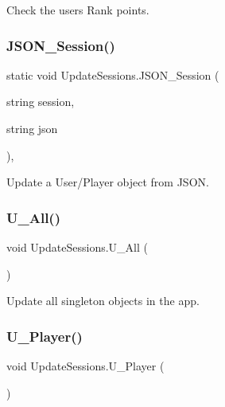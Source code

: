 Check the user\textquotesingle{}s Rank points. 

\mbox{\label{class_update_sessions_a841ee986ab762d64af283c9ba009c23d}} 
\subsubsection{\texorpdfstring{JSON\_Session()}{JSON\_Session()}}
{\footnotesize\ttfamily static void Update\+Sessions.\+J\+S\+O\+N\+\_\+\+Session (\begin{DoxyParamCaption}\item[{string}]{session,  }\item[{string}]{json }\end{DoxyParamCaption})\hspace{0.3cm}{\ttfamily [inline]}, {\ttfamily [static]}}



Update a User/\+Player object from J\+S\+ON. 

\mbox{\label{class_update_sessions_a0ea698e5b708671e7ba25a160b325833}} 
\subsubsection{\texorpdfstring{U\_All()}{U\_All()}}
{\footnotesize\ttfamily void Update\+Sessions.\+U\+\_\+\+All (\begin{DoxyParamCaption}{ }\end{DoxyParamCaption})\hspace{0.3cm}{\ttfamily [inline]}}



Update all singleton objects in the app. 

\mbox{\label{class_update_sessions_a888b2a028e131e41ea7e34607c0a5d45}} 
\subsubsection{\texorpdfstring{U\_Player()}{U\_Player()}}
{\footnotesize\ttfamily void Update\+Sessions.\+U\+\_\+\+Player (\begin{DoxyParamCaption}{ }\end{DoxyParamCaption})\hspace{0.3cm}{\ttfamily [inline]}}



